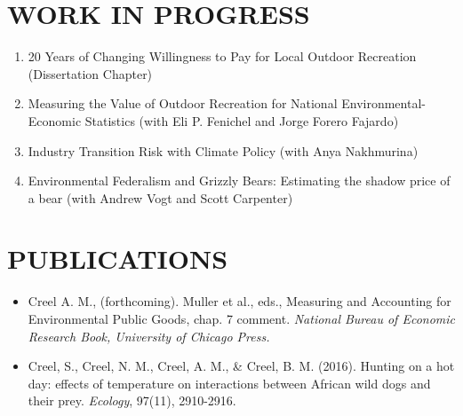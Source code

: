 \documentclass[11pt]{article}
\begin{document}
\section*{WORK IN PROGRESS}
\begin{enumerate}[left=0pt]
    \item 20 Years of Changing Willingness to Pay for Local Outdoor Recreation (Dissertation Chapter)
    \item Measuring the Value of Outdoor Recreation for National Environmental-Economic Statistics (with Eli P. Fenichel and Jorge Forero Fajardo)
    \item Industry Transition Risk with Climate Policy (with Anya Nakhmurina)
    \item Environmental Federalism and Grizzly Bears: Estimating the shadow price of a bear (with Andrew Vogt and Scott Carpenter)
\end{enumerate}

\section*{PUBLICATIONS}

\begin{itemize}[left=0pt, label={}, align=left, itemsep=0pt, parsep=0pt]
    \setlength{\itemindent}{-1em}
    \setlength{\leftskip}{1em}
    \setlength{\parindent}{-1em}
    \item Creel A. M., (forthcoming). Muller et al., eds., Measuring and Accounting for Environmental Public Goods, chap. 7 comment. \textit{National Bureau of Economic Research Book, University of Chicago Press.}
    \item Creel, S., Creel, N. M., Creel, A. M., \& Creel, B. M. (2016). Hunting on a hot day: effects of temperature on interactions between African wild dogs and their prey. \textit{Ecology}, 97(11), 2910-2916.
\end{itemize}
\end{document}
